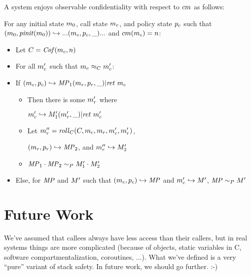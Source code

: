 \documentclass[acmsmall,review,anonymous]{acmart}\settopmatter{printfolios=true,printccs=false,printacmref=false}
\begin{document}
      A system enjoys observable confidentiality with respect to \(cm\) as follows:

      For any initial state \(m_0\), call state \(m_c\), and policy state \(p_c\) such that
      \((m_0,\mathit{pinit}(m_0)) \hookrightarrow ... (m_c,p_c,\_) ...\) and
      \(cm(m_c) = n\):

      \begin{itemize}
        \item Let \(C = \mathit{Cof}(m_c,n)\)
        \item For all \(m_c'\) such that \(m_c \approx_C m_c'\):
        \item If \((m_c,p_c) \hookrightarrow \mathit{MP}_1 (m_r,p_r,\_) | \mathit{ret}\ m_c\)
          \begin{itemize}
            \item Then there is some \(m_r'\) where

              \(m_c' \hookrightarrow M_1' (m_r',\_) | \mathit{ret}\ m_c'\)
            \item Let \(m_r'' = \mathit{roll}_C(C,m_c,m_r,m_c',m_r')\),

              \((m_r,p_r) \hookrightarrow \mathit{MP}_2\), and \(m_r'' \hookrightarrow M_2'\)
            \item \(\mathit{MP}_1 \cdot \mathit{MP}_2 \sim_P M_1' \cdot M_2'\)
          \end{itemize}
        \item Else, for \(\mathit{MP}\) and \(M'\) such that \((m_c,p_c) \hookrightarrow \mathit{MP}\)
          and \(m_c' \hookrightarrow M'\), \(\mathit{MP} \sim_P M'\)
      \end{itemize}


\section{Future Work}

We've assumed that callees always have less access than their callers, but
in real systems things are more complicated (because of objects, static
variables in C, software compartmentalization, coroutines, ...).  What we've
defined is a very ``pure'' variant of stack safety.  In future work, we
should go further. :-)
\end{document}
